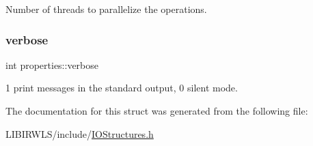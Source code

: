 Number of threads to parallelize the operations. \hypertarget{structproperties_a641ab2809e565e16086ee64e924cbd63}{}\label{structproperties_a641ab2809e565e16086ee64e924cbd63} 
\subsubsection{\texorpdfstring{verbose}{verbose}}
{\ttfamily int properties\+::verbose}

1 print messages in the standard output, 0 silent mode. 

The documentation for this struct was generated from the following file\+:\begin{DoxyCompactItemize}
\item 
L\+I\+B\+I\+R\+W\+L\+S/include/\hyperlink{IOStructures_8h}{I\+O\+Structures.\+h}\end{DoxyCompactItemize}
